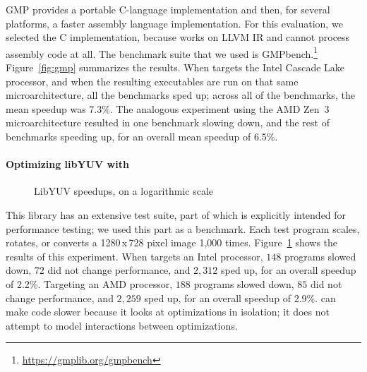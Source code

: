 GMP provides a portable C-language implementation and then, for
several platforms, a faster assembly language implementation.
%
For this evaluation, we selected the C implementation, because \minotaur{}
works on LLVM IR and cannot process assembly code at all.
%
The benchmark suite that we used is
GMPbench.\footnote{\url{https://gmplib.org/gmpbench}}
%
Figure~\ref{fig:gmp} summarizes the results.
%
When \minotaur{} targets the Intel Cascade Lake processor, and when the
resulting executables are run on that same microarchitecture,
all the benchmarks sped up;
across all of the benchmarks, the mean speedup was 7.3\%.
%
The analogous experiment using the AMD Zen~3 microarchitecture
resulted in one benchmark slowing down, and the rest of benchmarks
speeding up, for an overall mean speedup of 6.5\%.


\paragraph{Optimizing libYUV with \minotaur{}}


\begin{figure}[tbp]
  \centering
  \hfill
  \caption{LibYUV speedups, on a logarithmic scale}
  \label{fig:yuv}
\end{figure}


This library has an extensive test suite, part of which is explicitly
intended for performance testing; we used this part as a benchmark.
%
Each test program scales, rotates, or converts a 1280\,x\,728 pixel
image 1,000 times.
%
Figure~\ref{fig:yuv} shows the results of this experiment.
%
When \minotaur{} targets an Intel processor, $148$ programs slowed down, $72$
did not change performance, and $2,312$ sped up, for an overall speedup of
2.2\%.
%
Targeting an AMD processor, $188$ programs slowed down, $85$ did not
change performance, and $2,259$ sped up, for an overall speedup of 2.9\%.
%
\minotaur{} can make code slower because it looks at optimizations in
isolation; it does not attempt to model interactions between
optimizations.



